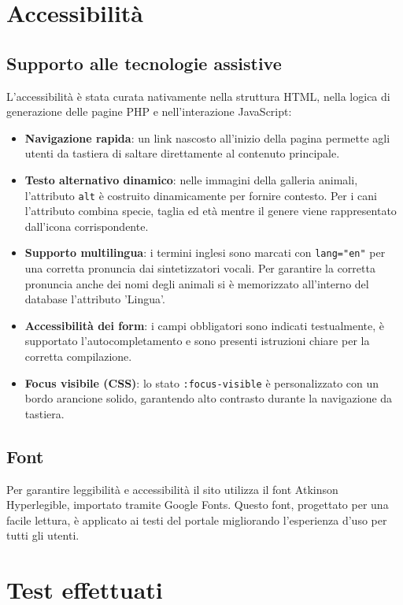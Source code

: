 \documentclass[10pt, letterpaper]{article}
\begin{document}
\section{Accessibilità}
\subsection{Supporto alle tecnologie assistive}
L'accessibilità è stata curata nativamente nella struttura HTML, nella logica di generazione delle pagine PHP e nell'interazione JavaScript:

\begin{itemize}
    \item \textbf{Navigazione rapida}: un link nascosto all'inizio della pagina permette agli utenti da tastiera di saltare direttamente al contenuto principale.
    \item \textbf{Testo alternativo dinamico}: nelle immagini della galleria animali, l'attributo \texttt{alt} è costruito dinamicamente per fornire contesto. 
    Per i cani l'attributo combina specie, taglia ed età mentre il genere viene rappresentato dall'icona corrispondente.
    \item \textbf{Supporto multilingua}: i termini inglesi sono marcati con \texttt{lang="en"} per una corretta pronuncia dai sintetizzatori vocali. Per garantire la corretta pronuncia anche dei nomi degli animali si è memorizzato all'interno del database l'attributo 'Lingua'.
    \item \textbf{Accessibilità dei form}: i campi obbligatori sono indicati testualmente, è supportato l'autocompletamento e sono presenti istruzioni chiare per la corretta compilazione.
    \item \textbf{Focus visibile (CSS)}: lo stato \texttt{:focus-visible} è personalizzato con un bordo arancione solido, garantendo alto contrasto durante la navigazione da tastiera.
\end{itemize}

\subsection{Font}
Per garantire leggibilità e accessibilità il sito utilizza il font Atkinson Hyperlegible, importato tramite Google Fonts. 
Questo font, progettato per una facile lettura, è applicato ai testi del portale migliorando l’esperienza d’uso per tutti gli utenti.

\section{Test effettuati}
\end{document}
